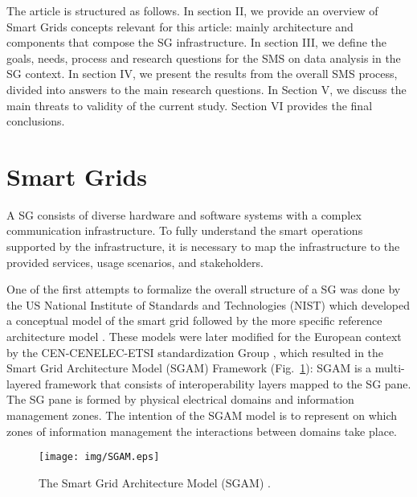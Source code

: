 \documentclass[journal]{IEEEtran}
\begin{document}
The article is structured as follows. In section II, we provide an overview of Smart Grids concepts relevant for this article: mainly architecture and components that compose the SG infrastructure. In section III, we define the goals, needs, process and research questions for the SMS on data analysis in the SG context. In section IV, we present the results from the overall SMS process, divided into answers to the main research questions. In Section V, we discuss the main threats to validity of the current study. Section VI provides the final conclusions.


\section{Smart Grids}

A SG consists of diverse hardware and software systems with a complex communication infrastructure. To fully understand the smart operations supported by the infrastructure, it is necessary to map the infrastructure to the provided services, usage scenarios, and stakeholders. 

One of the first attempts to formalize the overall structure of a SG was done by the US National Institute of Standards and Technologies (NIST) which developed a conceptual model of the smart grid \cite{ref:nist2010nist} followed by the more specific reference architecture model \cite{ref:frameworkroadmap}. These models were later modified for the European context by the CEN-CENELEC-ETSI standardization Group \cite{ref:cen2012group}, which resulted in the Smart Grid Architecture Model (SGAM) Framework (Fig.~\ref{fig:sgam}): SGAM is a multi-layered framework that consists of interoperability layers mapped to the SG pane. The SG pane is formed by physical electrical domains and information management zones. The intention of the SGAM model is to represent on which zones of information management the interactions between domains take place. 

\begin{figure}[!htbp]
\centering
\texttt{[image: img/SGAM.eps]}
\caption{The Smart Grid Architecture Model (SGAM) \cite{ref:cen2012group}.}
\label{fig:sgam}
\end{figure}
\end{document}
